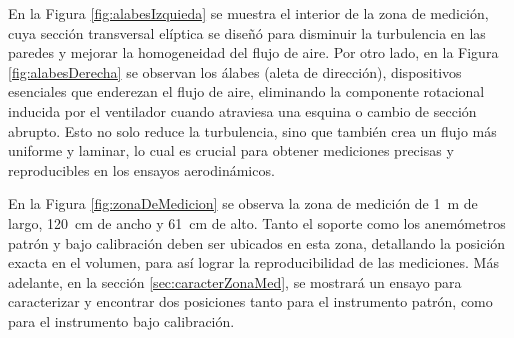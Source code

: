 En la Figura \ref{fig:alabesIzquieda} se muestra el interior de la zona de medición, cuya sección transversal elíptica se diseñó para disminuir la turbulencia en las paredes y mejorar la homogeneidad del flujo de aire. Por otro lado, en la Figura \ref{fig:alabesDerecha} se observan los álabes (aleta de dirección), dispositivos esenciales que enderezan el flujo de aire, eliminando la componente rotacional inducida por el ventilador cuando atraviesa una esquina o cambio de sección abrupto. Esto no solo reduce la turbulencia, sino que también crea un flujo más uniforme y laminar, lo cual es crucial para obtener mediciones precisas y reproducibles en los ensayos aerodinámicos. 

En la Figura \ref{fig:zonaDeMedicion} se observa la zona de medición de \SI{1}{\meter} de largo, \SI{120}{\centi\meter} de ancho y \SI{61}{\centi\meter} de alto. Tanto el soporte como los anemómetros patrón y bajo calibración deben ser ubicados en esta zona, detallando la posición exacta en el volumen, para así lograr la reproducibilidad de las mediciones. Más adelante, en la sección \ref{sec:caracterZonaMed}, se mostrará un ensayo para caracterizar y encontrar dos posiciones tanto para el instrumento patrón, como para el instrumento bajo calibración.

